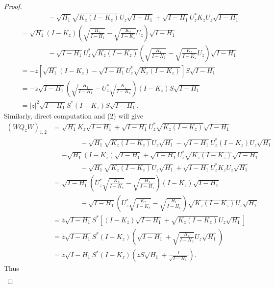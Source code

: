 \documentclass{amsart}
\begin{document}
\begin{proof}
\begin{align*}
                    & \qquad \qquad - \sqrt{H_1}\sqrt{K_{z}(I-K_{z})}U_{z}\sqrt{I-H_1} + \sqrt{I-H_1}U^{*}_{z}K_{z}U_{z}\sqrt{I - H_1}\\
                    &= \sqrt{H_1}(I-K_z)(\sqrt{\frac{H_1}{I-H_1}} - \sqrt{\frac{K_z}{I - K_z}}U_z)\sqrt{I-H_1} \\
                    & \qquad \qquad- \sqrt{I-H_1}U_{z}^{*}\sqrt{K_{z}(I- K_z)}(\sqrt{\frac{H_1}{I-H_1}} - \sqrt{\frac{K_z}{I - K_z}}U_z)\sqrt{I-H_1}\\
                    & = -z[\sqrt{H_1}(I-K_z)-\sqrt{I - H_1}U^{*}_{z}\sqrt{K_{z}(I-K_z)}]S\sqrt{I-H_1}\\
                    &= -z\sqrt{I-H_1}(\sqrt{\frac{H_1}{I-H_1}} - U^{*}_{z}\sqrt{\frac{K_z}{I-K_z}})(I-K_z)S\sqrt{I-H_1}\\
                    &= |z|^{2}\sqrt{I-H_1}S^{*}(I-K_z)S\sqrt{I-H_1}.
\end{align*}
Similarly, direct computation and (2) will give
\begin{align*}
(WQ_{z}W)_{1,2} &= \sqrt{H_1}K_{z}\sqrt{I - H_1} + \sqrt{I - H_1}U^{*}_{z}\sqrt{K_{z} (I - K_{z})}\sqrt{I - H_1} \\
                & \qquad \qquad -\sqrt{H_1}\sqrt{K_{z}(I-K_{z})}U_{z}\sqrt{H_1} - \sqrt{I-H_1}U^{*}_{z}(I - K_z)U_{z}\sqrt{H_1}\\
                &= -\sqrt{H_1}(I-K_{z})\sqrt{I - H_1} + \sqrt{I - H_1}U^{*}_{z}\sqrt{K_{z} (I - K_{z})}\sqrt{I - H_1} \\
                & \qquad \qquad -\sqrt{H_1}\sqrt{K_{z}(I-K_{z})}U_{z}\sqrt{H_1} + \sqrt{I-H_1}U^{*}_{z}K_{z}U_{z}\sqrt{H_1}\\
                & = \sqrt{I-H_1}(U^{*}_{z}\sqrt{\frac{K_z}{I-K_z}} - \sqrt{\frac{H_1}{I - H_1}})(I-K_z)\sqrt{I - H_1} \\
                & \qquad \qquad + \sqrt{I-H_1}(U^{*}_{z}\sqrt{\frac{K_z}{I-K_z}} - \sqrt{\frac{H_1}{I - H_1}})\sqrt{K_{z}(I-K_z)}U_{z}\sqrt{H_1}\\
                &= \overline{z}\sqrt{I-H_1}S^{*}[(I-K_z)\sqrt{I - H_1} + \sqrt{K_{z}(I-K_z)}U_{z}\sqrt{H_1}]\\
                &= \overline{z}\sqrt{I-H_1}S^{*}(I-K_z)(\sqrt{I-H_1} + \sqrt{\frac{K_z}{I - K_z}}U_{z}\sqrt{H_1})\\
                &= \overline{z}\sqrt{I-H_1}S^{*}(I-K_z)(zS\sqrt{H_1} + \frac{I}{\sqrt{I-H_1}}).
\end{align*}
Thus
\begin{equation}\label{(*)}
\begin{split}

\end{split}
\end{equation}
\end{proof}
\end{document}
